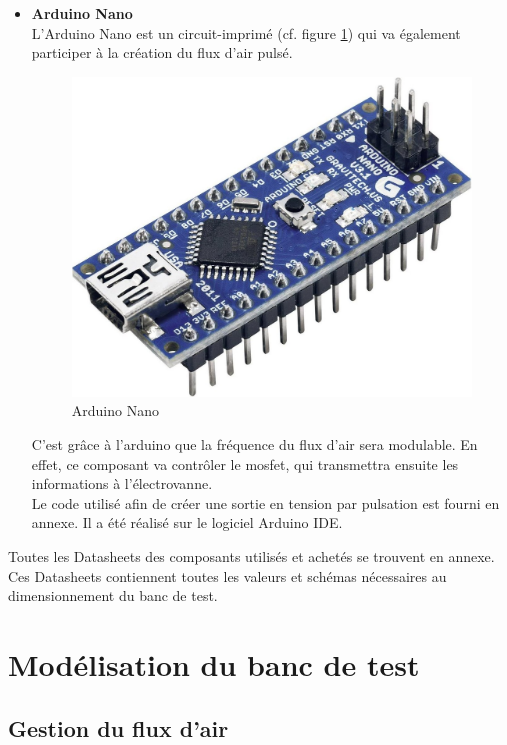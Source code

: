 \begin{itemize}
    \item \textbf{Arduino Nano}\\
          L'Arduino Nano est un circuit-imprimé (cf. figure \ref{fig:arduino}) qui va également participer à la création du flux d'air pulsé.
          \begin{figure}[H]
              \centering
              \includegraphics[scale = 0.11]{assets/figures/Arduino-Board-Nano-ATMega328.jpg}
              \caption{Arduino Nano}
              \label{fig:arduino}
          \end{figure}
          C'est grâce à l'arduino que la fréquence du flux d'air sera modulable. En effet, ce composant va contrôler le \gls{mosfet}, qui 
          transmettra ensuite les informations à l'électrovanne.\\
          Le code utilisé afin de créer une sortie en tension par pulsation est fourni en annexe. Il a été réalisé sur le logiciel Arduino IDE.\\
\end{itemize}

Toutes les Datasheets des composants utilisés et achetés se trouvent en annexe. Ces Datasheets contiennent toutes les valeurs et schémas nécessaires
au dimensionnement du banc de test.

\section{Modélisation du banc de test}
\subsection{Gestion du flux d'air}
